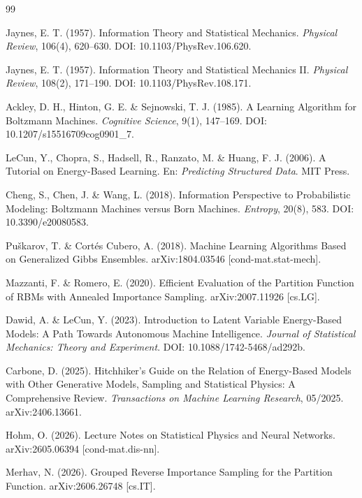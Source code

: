 \documentclass[12pt]{article}
\begin{document}
\begin{thebibliography}{99}

Jaynes, E. T. (1957). Information Theory and Statistical Mechanics. \textit{Physical Review},
106(4), 620--630. DOI: 10.1103/PhysRev.106.620.

Jaynes, E. T. (1957). Information Theory and Statistical Mechanics II. \textit{Physical
Review}, 108(2), 171--190. DOI: 10.1103/PhysRev.108.171.

Ackley, D. H., Hinton, G. E. \& Sejnowski, T. J. (1985). A Learning Algorithm for Boltzmann
Machines. \textit{Cognitive Science}, 9(1), 147--169. DOI: 10.1207/s15516709cog0901\_7.

LeCun, Y., Chopra, S., Hadsell, R., Ranzato, M. \& Huang, F. J. (2006). A Tutorial on
Energy-Based Learning. En: \textit{Predicting Structured Data}. MIT Press.

Cheng, S., Chen, J. \& Wang, L. (2018). Information Perspective to Probabilistic Modeling:
Boltzmann Machines versus Born Machines. \textit{Entropy}, 20(8), 583. DOI: 10.3390/e20080583.

Pu\v{s}karov, T. \& Cort\'es Cubero, A. (2018). Machine Learning Algorithms Based on
Generalized Gibbs Ensembles. arXiv:1804.03546 [cond-mat.stat-mech].

Mazzanti, F. \& Romero, E. (2020). Efficient Evaluation of the Partition Function of RBMs with
Annealed Importance Sampling. arXiv:2007.11926 [cs.LG].

Dawid, A. \& LeCun, Y. (2023). Introduction to Latent Variable Energy-Based Models: A Path
Towards Autonomous Machine Intelligence. \textit{Journal of Statistical Mechanics: Theory and
Experiment}. DOI: 10.1088/1742-5468/ad292b.

Carbone, D. (2025). Hitchhiker's Guide on the Relation of Energy-Based Models with Other
Generative Models, Sampling and Statistical Physics: A Comprehensive Review.
\textit{Transactions on Machine Learning Research}, 05/2025. arXiv:2406.13661.

Hohm, O. (2026). Lecture Notes on Statistical Physics and Neural Networks. arXiv:2605.06394
[cond-mat.dis-nn].

Merhav, N. (2026). Grouped Reverse Importance Sampling for the Partition Function.
arXiv:2606.26748 [cs.IT].

\end{thebibliography}
\end{document}
